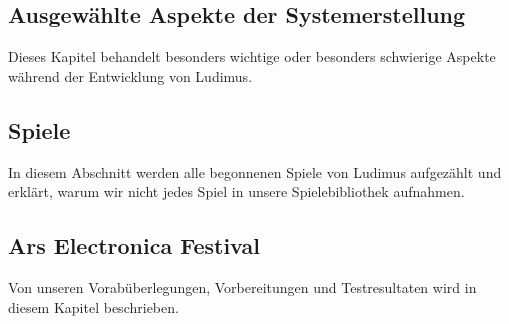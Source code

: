 \subsection{Ausgewählte Aspekte der Systemerstellung}
Dieses Kapitel behandelt besonders wichtige oder besonders schwierige Aspekte während der Entwicklung von Ludimus. 
\subsection{Spiele}
In diesem Abschnitt werden alle begonnenen Spiele von Ludimus aufgezählt und erklärt, warum wir nicht jedes Spiel in unsere Spielebibliothek aufnahmen.
\subsection{Ars Electronica Festival}
Von unseren Vorabüberlegungen, Vorbereitungen und Testresultaten wird in diesem Kapitel beschrieben. 